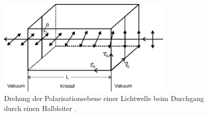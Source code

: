 \begin{figure}
    \centering
    \includegraphics[width=0.75\textwidth]{content/img/Anhang_Abb_1.pdf}
    \caption{Drehung der Polarisationsebene einer Lichtwelle beim Durchgang durch einen Halbleiter \cite{anhang}.}
    \label{fig:zirkulare_doppelbrechung}
\end{figure}
